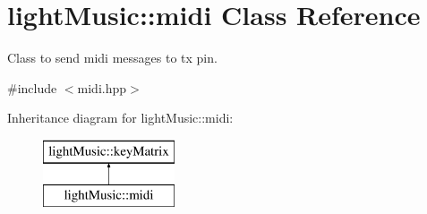 \hypertarget{classlight_music_1_1midi}{}\section{light\+Music\+:\+:midi Class Reference}
\label{classlight_music_1_1midi}


Class to send midi messages to tx pin.  




{\ttfamily \#include $<$midi.\+hpp$>$}

Inheritance diagram for light\+Music\+:\+:midi\+:\begin{figure}[H]
\begin{center}
\leavevmode
\includegraphics[height=2.000000cm]{classlight_music_1_1midi}
\end{center}
\end{figure}
